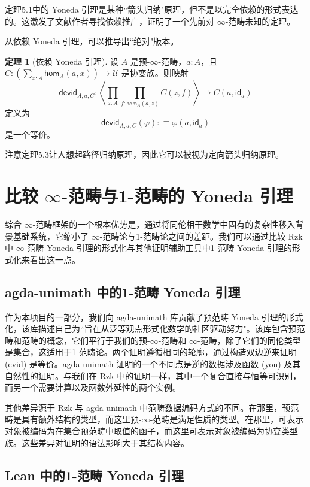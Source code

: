 \documentclass[12pt,a4paper]{article}
\theoremstyle{definition}
\newtheorem{theorem}{定理}[section]
\theoremstyle{definition}
\begin{document}
定理5.1中的 Yoneda 引理是某种``箭头归纳"原理，但不是以完全依赖的形式表达的。这激发了文献作者寻找依赖推广，证明了一个先前对 $\infty$-范畴未知的定理。

从依赖 Yoneda 引理，可以推导出``绝对"版本。

\begin{theorem}[依赖 Yoneda 引理]
设 $A$ 是预-$\infty$-范畴，$a:A$，且 $C:\left(\sum_{x:A} \mathsf{hom}_A(a,x)\right) \to \mathcal{U}$ 是协变族。则映射
\[
\mathsf{devid}_{A,a,C} : \left\langle \prod_{z:A} \prod_{f:\mathsf{hom}_A(a,z)} C(z,f) \right\rangle \to C(a, \mathsf{id}_a)
\]
定义为
\[
\mathsf{devid}_{A,a,C}(\varphi) :\equiv \varphi(a, \mathsf{id}_a)
\]
是一个等价。
\end{theorem}

注意定理5.3让人想起路径归纳原理，因此它可以被视为定向箭头归纳原理。

\section{比较 $\infty$-范畴与1-范畴的 Yoneda 引理}

综合 $\infty$-范畴框架的一个根本优势是，通过将同伦相干数学中固有的复杂性移入背景基础系统，它缩小了 $\infty$-范畴论与1-范畴论之间的差距。我们可以通过比较 Rzk 中 $\infty$-范畴 Yoneda 引理的形式化与其他证明辅助工具中1-范畴 Yoneda 引理的形式化来看出这一点。

\subsection{agda-unimath 中的1-范畴 Yoneda 引理}

作为本项目的一部分，我们向 agda-unimath 库贡献了预范畴 Yoneda 引理的形式化，该库描述自己为``旨在从泛等观点形式化数学的社区驱动努力"。该库包含预范畴和范畴的概念，它们平行于我们的预-$\infty$-范畴和 $\infty$-范畴，除了它们的同伦类型是集合，这适用于1-范畴论。两个证明遵循相同的轮廓，通过构造双边逆来证明 (evid) 是等价。agda-unimath 证明的一个不同点是逆的数据涉及函数 (yon) 及其自然性的证明。与我们在 Rzk 中的证明一样，其中一个复合直接与恒等可识别，而另一个需要计算以及函数外延性的两个实例。

其他差异源于 Rzk 与 agda-unimath 中范畴数据编码方式的不同。在那里，预范畴是具有额外结构的类型，而这里预-$\infty$-范畴是满足性质的类型。在那里，可表示对象被编码为在集合预范畴中取值的函子，而这里可表示对象被编码为协变类型族。这些差异对证明的语法影响大于其结构内容。

\subsection{Lean 中的1-范畴 Yoneda 引理}
\end{document}
